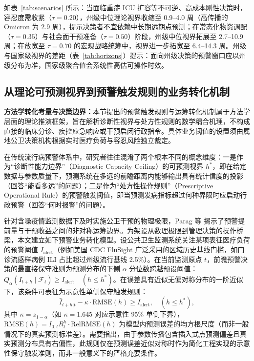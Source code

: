 \documentclass[11pt,a4paper]{article}
\theoremstyle{plain}
\theoremstyle{definition}
\begin{document}
如表~\ref{tab:scenarios} 所示：当面临重症 ICU 扩容等不可逆、高成本刚性决策时，容忍度需收紧（$\tau = 0.20$），州级中位理论视界收缩至 0.9--4.0 周（高传播的 Omicron 为 2.9 周），提示决策者不宜依赖中长期远期点预测；在常态化物资调配（$\tau = 0.35$）与社会面干预准备（$\tau = 0.50$）阶段，州级中位视界拓展至 2.7--10.9 周；在放宽至 $\tau = 0.70$ 的宏观战略统筹中，视界进一步拓宽至 6.4--14.3 周。州级与国家级视界的差距（表~\ref{tab:horizons}）提示：面向州级决策的预警窗口应以州级分布为准，国家级聚合值会系统性高估可操作时效。

\subsection{从理论可预测视界到预警触发规则的业务转化机制}

\noindent\textbf{方法学转化考量与决策边界：}本节提出的预警触发规则与运筹转化机制属于方法学层面的理论推演框架，旨在解析诊断性视界与处方性规则的数学耦合机理，不构成直接的临床分诊、疾控应急响应或干预启闭行政指令。具体业务阈值的设置须由属地公卫决策机构根据实时医疗负荷与容忍风险独立裁定。

在传统流行病预警体系中，研究者往往混淆了两个根本不同的概念维度：一是作为“诊断性能力边界”（Diagnostic Capacity Ceiling）的可预测视界 $h^*$，即在给定数据与参数质量下，预测系统在多远的前瞻距离内能够输出具有统计信度的投影（回答“能看多远”的问题）；二是作为“处方性操作规则”（Prescriptive Operational Rule）的预警触发阈值，即当预测发病指标超过何种界限时应启动行政预警（回答“何时报警”的问题）。

针对含噪疫情监测数据下及时实施公卫干预的物理极限，Parag 等\citep{parag2025asymmetric} 揭示了预警提前量与干预收益之间的非对称运筹边界。为架设从数理极限到管理决策的操作桥梁，本文建立如下预警业务转化模型。设公共卫生监测系统关注某项表征医疗负荷的预警阈值 $I_{\text{alert}}$（例如美国 CDC FluSight 广泛采用的区域历史基线门槛，如门诊流感样病例 ILI 占比超过州级流行基线 2.5\%）。在当前监测原点 $t$，前瞻预警决策的最直接保守准则为预测分布的下侧 $\alpha$ 分位数跨越预设阈值：$Q_\alpha(I_{t+h} \mid \mathcal{F}_t) \ge I_{\text{alert}} \quad (h \le h^*)$。在误差具有近似无偏对称分布的一阶近似下，该条件可表征为示意性单侧保守触发规则：
\begin{equation}
\hat{I}_{t+h|t} - \kappa \cdot \text{RMSE}(h) \ge I_{\text{alert}}, \quad (h \le h^*),
\label{eq:alert_rule}
\end{equation}
其中 $\kappa = z_{1-\alpha}$（如 $\kappa = 1.645$ 对应示意性 95\% 单侧下界），$\text{RMSE}(h) = I_{0,t} R_t^h \cdot \text{RelRMSE}(h)$ 为模型内预测误差的均方根尺度（而非一般情况下的真实预测标准差）。需要指出，由于参数传播包含插入式点预测偏差且真实预测分布具有右偏性，此规则仅在预测误差近似对称时作为简化工程实现的示意性保守触发准则，而非一般意义下的严格充要条件。
\end{document}
